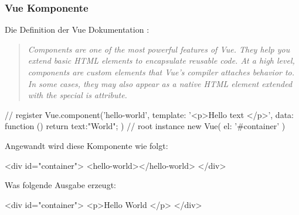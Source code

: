 \subsubsection{Vue Komponente}
Die Definition der Vue Dokumentation \cite{vue-component}: 
\begin{quote}
	\begin{english}
		\textit{Components are one of the most powerful features of Vue. They help you extend basic HTML elements to encapsulate reusable code. At a high level, components are custom elements that Vue’s compiler attaches behavior to. In some cases, they may also appear as a native HTML element extended with the special is attribute.}
	\end{english}
\end{quote}

\begin{JsCode}
// register
Vue.component('hello-world', {
	template: '<p>Hello {{ text }} </p>',
	data: function () {
		return {text:"World"};
	}
})
// root instance
new Vue({
	el: '#container'
})
\end{JsCode}

Angewandt wird diese Komponente wie folgt:
\begin{JsCode}[numbers=none]
<div id="container">
	<hello-world></hello-world>
</div>
\end{JsCode}
Was folgende Ausgabe erzeugt:
\begin{JsCode}[numbers=none]
<div id="container">
	<p>Hello World </p>
</div>
\end{JsCode}
